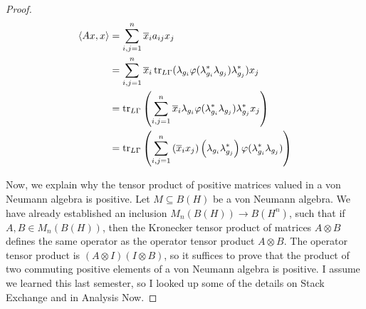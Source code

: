 \documentclass[a4paper,10pt]{report}
\newcommand{\ggen}[1]{\langle#1\rangle}
\newcommand{\ol}[1]{\overline{#1}}
\newcommand{\tens}{\otimes}
\begin{document}
\begin{enumerate}
\begin{proof}
\begin{align*}
				\ggen{Ax, x} & = \sum_{i,j=1}^n{\ol{x}_i a_{ij} x_j} \\
				 & = \sum_{i,j=1}^n{\ol{x}_i \tr_{L\Gamma}(\lambda_{g_i}
				 \varphi(\lambda_{g_i}^* \lambda_{g_j})\lambda_{g_j}^*) x_j} \\
				 & = \tr_{L\Gamma}\left( \sum_{i,j=1}^n{\ol{x}_i \lambda_{g_i}
				 \varphi(\lambda_{g_i}^* \lambda_{g_j})\lambda_{g_j}^* x_j} \right) \\
				 & = \tr_{L\Gamma}\left( \sum_{i,j=1}^n{
				 \left( \ol{x}_i x_j \right)
				\left( \lambda_{g_i} \lambda_{g_j}^* \right)
				\varphi(\lambda_{g_i}^* \lambda_{g_j})} \right)
			\end{align*}
			
			Now, we explain why the tensor product of positive matrices valued in a von Neumann algebra is positive. Let $M\subseteq B(H)$ be a von Neumann algebra. We have already established an inclusion $M_n(B(H))\to B(H^n)$, such that if $A,B\in M_n(B(H))$, then the Kronecker tensor product of matrices $A\tens B$ defines the same operator as the operator tensor product $A\tens B$. The operator tensor product is $(A\tens I)(I\tens B)$, so it suffices to prove that the product of two commuting positive elements of a von Neumann algebra is positive. I assume we learned this last semester, so I looked up some of the details on Stack Exchange and in Analysis Now. 
		

\end{proof}
\end{enumerate}
\end{document}
